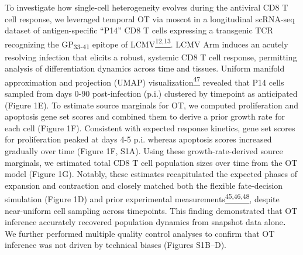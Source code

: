 To investigate how single-cell heterogeneity evolves during the
antiviral CD8 T cell response, we leveraged temporal OT via moscot in a
longitudinal scRNA-seq dataset of antigen-specific ``P14'' CD8 T cells
expressing a transgenic TCR recognizing the GP\textsubscript{33-41}
epitope of
LCMV\href{https://sciwheel.com/work/citation?ids=8940021,8917053\&pre=\&pre=\&suf=\&suf=\&sa=0,0\&dbf=0\&dbf=0}{\textsuperscript{12,13}}.
LCMV Arm induces an acutely resolving infection that elicits a robust,
systemic CD8 T cell response, permitting analysis of differentiation
dynamics across time and tissues. Uniform manifold approximation and
projection (UMAP)
visualization\href{https://sciwheel.com/work/citation?ids=18537601\&pre=\&suf=\&sa=0\&dbf=0}{\textsuperscript{47}}
revealed that P14 cells sampled from days 0-90 post-infection (p.i.)
clustered by timepoint as anticipated (Figure 1E). To estimate source
marginals for OT, we computed proliferation and apoptosis gene set
scores and combined them to derive a prior growth rate for each cell
(Figure 1F). Consistent with expected response kinetics, gene set scores
for proliferation peaked at days 4-5 p.i. whereas apoptosis scores
increased gradually over time (Figure 1F, S1A). Using these
growth-rate-derived source marginals, we estimated total CD8 T cell
population sizes over time from the OT model (Figure 1G). Notably, these
estimates recapitulated the expected phases of expansion and contraction
and closely matched both the flexible fate-decision simulation (Figure
1D) and prior experimental
measurements\href{https://sciwheel.com/work/citation?ids=424634,8454326,147094\&pre=\&pre=\&pre=\&suf=\&suf=\&suf=\&sa=0,0,0\&dbf=0\&dbf=0\&dbf=0}{\textsuperscript{45,46,48}},
despite near-uniform cell sampling across timepoints. This finding
demonstrated that OT inference accurately recovered population dynamics
from snapshot data alone\textbf{.} We further performed multiple quality
control analyses to confirm that OT inference was not driven by
technical biases (Figures S1B--D).

